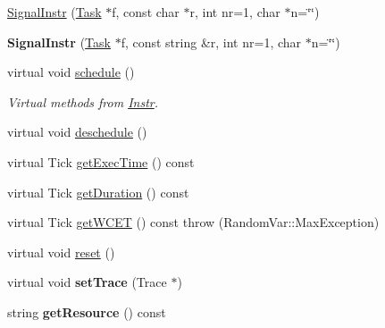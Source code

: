 \begin{DoxyCompactItemize}
\item 
\hyperlink{classRTSim_1_1SignalInstr_afabe5b3753b0b9891abf244680fbe044}{Signal\+Instr} (\hyperlink{classRTSim_1_1Task}{Task} $\ast$f, const char $\ast$r, int nr=1, char $\ast$n=\char`\"{}\char`\"{})
\item 
{\bfseries Signal\+Instr} (\hyperlink{classRTSim_1_1Task}{Task} $\ast$f, const string \&r, int nr=1, char $\ast$n=\char`\"{}\char`\"{})\hypertarget{classRTSim_1_1SignalInstr_a4e3e31fd24a77bfba03f6f219130ec11}{}\label{classRTSim_1_1SignalInstr_a4e3e31fd24a77bfba03f6f219130ec11}

\item 
virtual void \hyperlink{classRTSim_1_1SignalInstr_a4ffd013ebb12852ee32ce78302013965}{schedule} ()\hypertarget{classRTSim_1_1SignalInstr_a4ffd013ebb12852ee32ce78302013965}{}\label{classRTSim_1_1SignalInstr_a4ffd013ebb12852ee32ce78302013965}

\begin{DoxyCompactList}\small\item\em Virtual methods from \hyperlink{classRTSim_1_1Instr}{Instr}. \end{DoxyCompactList}\item 
virtual void \hyperlink{classRTSim_1_1SignalInstr_a3f8abc9e3cc44d100262fbbdbbf62f6b}{deschedule} ()
\item 
virtual Tick \hyperlink{classRTSim_1_1SignalInstr_af53c39ea9b87d916e226abd66a2fa48d}{get\+Exec\+Time} () const 
\item 
virtual Tick \hyperlink{classRTSim_1_1SignalInstr_a079ebb7e39ac4f39511cb3f8dc59f3cb}{get\+Duration} () const 
\item 
virtual Tick \hyperlink{classRTSim_1_1SignalInstr_a6ea54f2b76b76a1c65df8ee37a8d17b5}{get\+W\+C\+ET} () const   throw (\+Random\+Var\+::\+Max\+Exception)
\item 
virtual void \hyperlink{classRTSim_1_1SignalInstr_a4ec7853ec2ceb690353124269fc48178}{reset} ()
\item 
virtual void {\bfseries set\+Trace} (Trace $\ast$)\hypertarget{classRTSim_1_1SignalInstr_a062880a7fbf6f354e4593d9dd8e968d3}{}\label{classRTSim_1_1SignalInstr_a062880a7fbf6f354e4593d9dd8e968d3}

\item 
string {\bfseries get\+Resource} () const \hypertarget{classRTSim_1_1SignalInstr_a6fe4b7472c1392ff128e6bc809ee9316}{}\label{classRTSim_1_1SignalInstr_a6fe4b7472c1392ff128e6bc809ee9316}


\end{DoxyCompactItemize}
